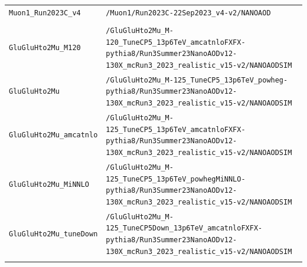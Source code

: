 \begin{longtable}{@{}>{\RaggedRight\arraybackslash}p{} >{\RaggedRight\arraybackslash}p{}@{}}
\addlinespace[2pt]
\texttt{Muon1\_\allowbreak{}Run2023C\_\allowbreak{}v4} & \texttt{/\allowbreak{}Muon1/\allowbreak{}Run2023C-\allowbreak{}22Sep2023\_\allowbreak{}v4-\allowbreak{}v2/\allowbreak{}NANOAOD} \\
\addlinespace[2pt]
\addlinespace[4pt]
\multicolumn{2}{@{}l}{\bfseries Simulation (104 samples)} \\
\addlinespace[2pt]
\texttt{GluGluHto2Mu\_\allowbreak{}M120} & \texttt{/\allowbreak{}GluGluHto2Mu\_\allowbreak{}M-\allowbreak{}120\_\allowbreak{}TuneCP5\_\allowbreak{}13p6TeV\_\allowbreak{}amcatnloFXFX-\allowbreak{}pythia8/\allowbreak{}Run3Summer23NanoAODv12-\allowbreak{}130X\_\allowbreak{}mcRun3\_\allowbreak{}2023\_\allowbreak{}realistic\_\allowbreak{}v15-\allowbreak{}v2/\allowbreak{}NANOAODSIM} \\
\addlinespace[2pt]
\texttt{GluGluHto2Mu} & \texttt{/\allowbreak{}GluGluHto2Mu\_\allowbreak{}M-\allowbreak{}125\_\allowbreak{}TuneCP5\_\allowbreak{}13p6TeV\_\allowbreak{}powheg-\allowbreak{}pythia8/\allowbreak{}Run3Summer23NanoAODv12-\allowbreak{}130X\_\allowbreak{}mcRun3\_\allowbreak{}2023\_\allowbreak{}realistic\_\allowbreak{}v15-\allowbreak{}v2/\allowbreak{}NANOAODSIM} \\
\addlinespace[2pt]
\texttt{GluGluHto2Mu\_\allowbreak{}amcatnlo} & \texttt{/\allowbreak{}GluGluHto2Mu\_\allowbreak{}M-\allowbreak{}125\_\allowbreak{}TuneCP5\_\allowbreak{}13p6TeV\_\allowbreak{}amcatnloFXFX-\allowbreak{}pythia8/\allowbreak{}Run3Summer23NanoAODv12-\allowbreak{}130X\_\allowbreak{}mcRun3\_\allowbreak{}2023\_\allowbreak{}realistic\_\allowbreak{}v15-\allowbreak{}v2/\allowbreak{}NANOAODSIM} \\
\addlinespace[2pt]
\texttt{GluGluHto2Mu\_\allowbreak{}MiNNLO} & \texttt{/\allowbreak{}GluGluHto2Mu\_\allowbreak{}M-\allowbreak{}125\_\allowbreak{}TuneCP5\_\allowbreak{}13p6TeV\_\allowbreak{}powhegMiNNLO-\allowbreak{}pythia8/\allowbreak{}Run3Summer23NanoAODv12-\allowbreak{}130X\_\allowbreak{}mcRun3\_\allowbreak{}2023\_\allowbreak{}realistic\_\allowbreak{}v15-\allowbreak{}v2/\allowbreak{}NANOAODSIM} \\
\addlinespace[2pt]
\texttt{GluGluHto2Mu\_\allowbreak{}tuneDown} & \texttt{/\allowbreak{}GluGluHto2Mu\_\allowbreak{}M-\allowbreak{}125\_\allowbreak{}TuneCP5Down\_\allowbreak{}13p6TeV\_\allowbreak{}amcatnloFXFX-\allowbreak{}pythia8/\allowbreak{}Run3Summer23NanoAODv12-\allowbreak{}130X\_\allowbreak{}mcRun3\_\allowbreak{}2023\_\allowbreak{}realistic\_\allowbreak{}v15-\allowbreak{}v2/\allowbreak{}NANOAODSIM} \\
\addlinespace[2pt]

\end{longtable}
